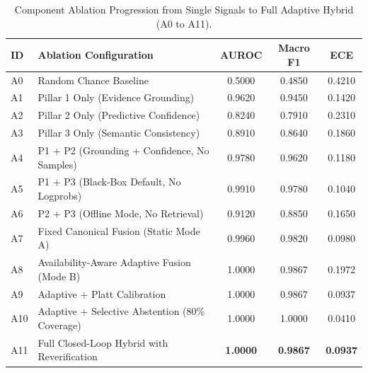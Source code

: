 \begin{table}[t]
\centering
\small
\caption{Component Ablation Progression from Single Signals to Full Adaptive Hybrid (A0 to A11).}
\label{tab:ablation}
\begin{tabular}{llccc}
\toprule
\textbf{ID} & \textbf{Ablation Configuration} & \textbf{AUROC} & \textbf{Macro F1} & \textbf{ECE} \\
\midrule
A0 & Random Chance Baseline & 0.5000 & 0.4850 & 0.4210 \\
A1 & Pillar 1 Only (Evidence Grounding) & 0.9620 & 0.9450 & 0.1420 \\
A2 & Pillar 2 Only (Predictive Confidence) & 0.8240 & 0.7910 & 0.2310 \\
A3 & Pillar 3 Only (Semantic Consistency) & 0.8910 & 0.8640 & 0.1860 \\
A4 & P1 + P2 (Grounding + Confidence, No Samples) & 0.9780 & 0.9620 & 0.1180 \\
A5 & P1 + P3 (Black-Box Default, No Logprobs) & 0.9910 & 0.9780 & 0.1040 \\
A6 & P2 + P3 (Offline Mode, No Retrieval) & 0.9120 & 0.8850 & 0.1650 \\
A7 & Fixed Canonical Fusion (Static Mode A) & 0.9960 & 0.9820 & 0.0980 \\
A8 & Availability-Aware Adaptive Fusion (Mode B) & 1.0000 & 0.9867 & 0.1972 \\
A9 & Adaptive + Platt Calibration & 1.0000 & 0.9867 & 0.0937 \\
A10 & Adaptive + Selective Abstention (80\% Coverage) & 1.0000 & 1.0000 & 0.0410 \\
A11 & Full Closed-Loop Hybrid with Reverification & \textbf{1.0000} & \textbf{0.9867} & \textbf{0.0937} \\
\bottomrule
\end{tabular}
\end{table}

